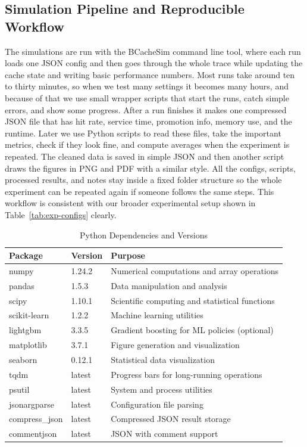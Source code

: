 \documentclass[sigconf]{acmart}
\begin{document}
\subsection{Simulation Pipeline and Reproducible Workflow}
The simulations are run with the BCacheSim command line tool, where each run loads one JSON config and then goes through the whole trace while updating the cache state and writing basic performance numbers. Most runs take around ten to thirty minutes, so when we test many settings it becomes many hours, and because of that we use small wrapper scripts that start the runs, catch simple errors, and show some progress. After a run finishes it makes one compressed JSON file that has hit rate, service time, promotion info, memory use, and the runtime. Later we use Python scripts to read these files, take the important metrics, check if they look fine, and compute averages when the experiment is repeated. The cleaned data is saved in simple JSON and then another script draws the figures in PNG and PDF with a similar style. All the configs, scripts, processed results, and notes stay inside a fixed folder structure so the whole experiment can be repeated again if someone follows the same steps. This workflow is consistent with our broader experimental setup shown in Table~\ref{tab:exp-configs} clearly.



\begin{table}[t]
\caption{Python Dependencies and Versions}
\label{tab:python-deps}
\centering

\renewcommand{\arraystretch}{1.05}

\begin{tabular}{p{} p{} p{}}
\toprule
\textbf{Package} & \textbf{Version} & \textbf{Purpose} \\
\midrule
numpy          & 1.24.2 & Numerical computations and array operations \\
pandas         & 1.5.3  & Data manipulation and analysis \\
scipy          & 1.10.1 & Scientific computing and statistical functions \\
scikit-learn   & 1.2.2  & Machine learning utilities \\
lightgbm       & 3.3.5  & Gradient boosting for ML policies (optional) \\
matplotlib     & 3.7.1  & Figure generation and visualization \\
seaborn        & 0.12.1 & Statistical data visualization \\
tqdm           & latest & Progress bars for long-running operations \\
psutil         & latest & System and process utilities \\
jsonargparse   & latest & Configuration file parsing \\
compress\_json & latest & Compressed JSON result storage \\
commentjson    & latest & JSON with comment support \\
\bottomrule
\end{tabular}
\end{table}
\end{document}
